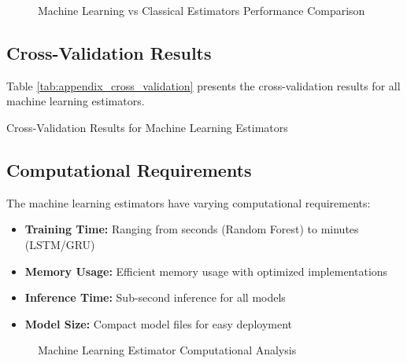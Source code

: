\begin{figure}[h]
\centering
\caption{Machine Learning vs Classical Estimators Performance Comparison}
\label{fig:appendix_ml_comparison}
\end{figure}

\subsection{Cross-Validation Results}

Table \ref{tab:appendix_cross_validation} presents the cross-validation results for all machine learning estimators.

\begin{table}[h]
\centering
\caption{Cross-Validation Results for Machine Learning Estimators}
\label{tab:appendix_cross_validation}
\end{table}

\subsection{Computational Requirements}

The machine learning estimators have varying computational requirements:

\begin{itemize}
    \item \textbf{Training Time:} Ranging from seconds (Random Forest) to minutes (LSTM/GRU)
    \item \textbf{Memory Usage:} Efficient memory usage with optimized implementations
    \item \textbf{Inference Time:} Sub-second inference for all models
    \item \textbf{Model Size:} Compact model files for easy deployment
\end{itemize}

\begin{figure}[h]
\centering
\caption{Machine Learning Estimator Computational Analysis}
\label{fig:appendix_ml_computational}
\end{figure}
